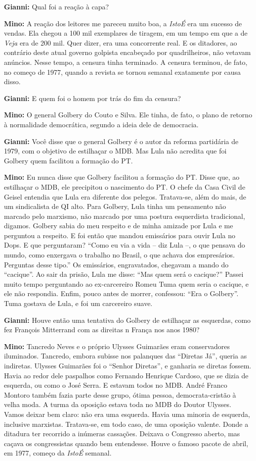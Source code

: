 \textbf{Gianni:} Qual foi a reação à capa?

\textbf{Mino:} A reação dos leitores me pareceu muito boa, a
\emph{IstoÉ} era um sucesso de vendas. Ela chegou a 100 mil exemplares
de tiragem, em um tempo em que a de \emph{Veja} era de 200 mil. Quer
dizer, era uma concorrente real. E os ditadores, ao contrário deste
atual governo golpista encabeçado por quadrilheiros, não vetavam
anúncios. Nesse tempo, a censura tinha terminado. A censura terminou, de
fato, no começo de 1977, quando a revista se tornou semanal exatamente
por causa disso.

\textbf{Gianni:} E quem foi o homem por trás do fim da censura?

\textbf{Mino:} O general Golbery do Couto e Silva. Ele tinha, de fato, o
plano de retorno à normalidade democrática, segundo a ideia dele de
democracia.

\textbf{Gianni:} Você disse que o general Golbery é o autor da reforma
partidária de 1979, com o objetivo de estilhaçar o MDB. Mas Lula não
acredita que foi Golbery quem facilitou a formação do PT.

\textbf{Mino:} Eu nunca disse que Golbery facilitou a formação do PT.
Disse que, ao estilhaçar o MDB, ele precipitou o nascimento do PT. O
chefe da Casa Civil de Geisel entendia que Lula era diferente dos
pelegos. Tratava-se, além do mais, de um sindicalista de QI alto. Para
Golbery, Lula tinha um pensamento não marcado pelo marxismo, não marcado
por uma postura esquerdista tradicional, digamos. Golbery sabia do meu
respeito e de minha amizade por Lula e me perguntou a respeito. E foi
então que mandou emissários para ouvir Lula no Dops. E que perguntaram?
``Como eu via a vida -- diz Lula --, o que pensava do mundo, como
enxergava o trabalho no Brasil, o que achava dos empresários. Perguntas
desse tipo.'' Os emissários, engravatados, chegavam a mando do
``cacique''. Ao sair da prisão, Lula me disse: ``Mas quem será o
cacique?'' Passei muito tempo perguntando ao ex-carcereiro Romeu Tuma
quem seria o cacique, e ele não respondia. Enfim, pouco antes de morrer,
confessou: ``Era o Golbery''. Tuma gostava de Lula, e foi um carcereiro
suave.

\textbf{Gianni:} Houve então uma tentativa do Golbery de estilhaçar as
esquerdas, como fez François Mitterrand com as direitas n França nos
anos 1980?

\textbf{Mino:} Tancredo Neves e o próprio Ulysses Guimarães eram
conservadores iluminados. Tancredo, embora subisse nos palanques das
``Diretas Já'', queria as indiretas. Ulysses Guimarães foi o ``Senhor
Diretas'', e ganharia se diretas fossem. Havia ao redor dele paspalhos
como Fernando Henrique Cardoso, que se dizia de esquerda, ou como o José
Serra. E estavam todos no MDB. André Franco Montoro também fazia parte
desse grupo, ótima pessoa, democrata-cristão à velha moda. A turma da
oposição estava toda no MDB do Doutor Ulysses. Vamos deixar bem claro:
não era uma esquerda. Havia uma minoria de esquerda, inclusive
marxistas. Tratava-se, em todo caso, de uma oposição valente. Donde a
ditadura ter recorrido a inúmeras cassações. Deixava o Congresso aberto,
mas caçava os congressistas quando bem entendesse. Houve o famoso pacote
de abril, em 1977, começo da \emph{IstoÉ} semanal.


